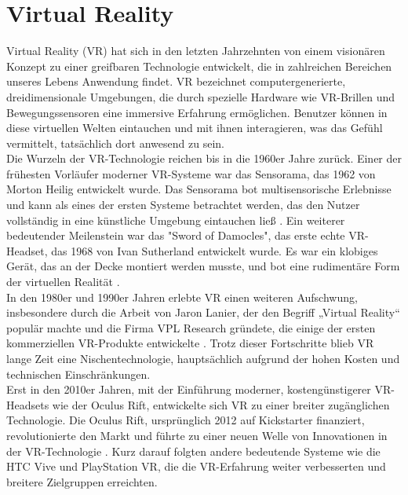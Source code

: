 \section{Virtual Reality}
Virtual Reality (VR) hat sich in den letzten Jahrzehnten von einem visionären Konzept zu einer greifbaren Technologie entwickelt, die in zahlreichen Bereichen unseres Lebens Anwendung findet. VR bezeichnet computergenerierte, dreidimensionale Umgebungen, die durch spezielle Hardware wie VR-Brillen und Bewegungssensoren eine immersive Erfahrung ermöglichen. Benutzer können in diese virtuellen Welten eintauchen und mit ihnen interagieren, was das Gefühl vermittelt, tatsächlich dort anwesend zu sein.
\\

\noindent
Die Wurzeln der VR-Technologie reichen bis in die 1960er Jahre zurück. Einer der frühesten Vorläufer moderner VR-Systeme war das Sensorama, das 1962 von Morton Heilig entwickelt wurde. Das Sensorama bot multisensorische Erlebnisse und kann als eines der ersten Systeme betrachtet werden, das den Nutzer vollständig in eine künstliche Umgebung eintauchen ließ \cite{heilig1962}. Ein weiterer bedeutender Meilenstein war das "Sword of Damocles", das erste echte VR-Headset, das 1968 von Ivan Sutherland entwickelt wurde. Es war ein klobiges Gerät, das an der Decke montiert werden musste, und bot eine rudimentäre Form der virtuellen Realität \cite{sutherland1968}.
\\

\noindent
In den 1980er und 1990er Jahren erlebte VR einen weiteren Aufschwung, insbesondere durch die Arbeit von Jaron Lanier, der den Begriff „Virtual Reality“ populär machte und die Firma VPL Research gründete, die einige der ersten kommerziellen VR-Produkte entwickelte \cite{lanier1992}. Trotz dieser Fortschritte blieb VR lange Zeit eine Nischentechnologie, hauptsächlich aufgrund der hohen Kosten und technischen Einschränkungen.
\\

\noindent
Erst in den 2010er Jahren, mit der Einführung moderner, kostengünstigerer VR-Headsets wie der Oculus Rift, entwickelte sich VR zu einer breiter zugänglichen Technologie. Die Oculus Rift, ursprünglich 2012 auf Kickstarter finanziert, revolutionierte den Markt und führte zu einer neuen Welle von Innovationen in der VR-Technologie \cite{luckey2012}. Kurz darauf folgten andere bedeutende Systeme wie die HTC Vive und PlayStation VR, die die VR-Erfahrung weiter verbesserten und breitere Zielgruppen erreichten.
\\

